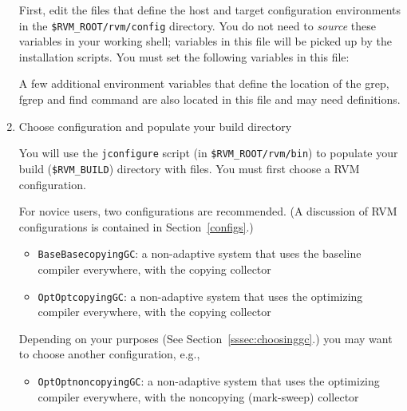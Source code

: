 \begin{enumerate}
First, edit the files that define the host and target configuration
environments in the {\tt \$RVM\_ROOT/rvm/config} directory.  You do not need to {\em
source} these variables in your working shell; variables in this file will be 
picked up by the installation scripts.  You must set the following
variables in this file:

A few additional environment variables that define the location of
the grep, fgrep and find command are also located in this file and
may need definitions.


\item Choose configuration and populate your build directory

You will use the {\tt jconfigure} script (in {\tt \$RVM\_ROOT/rvm/bin}) to
populate your build ({\tt \$RVM\_BUILD}) directory with files.  You must
first choose a RVM configuration.

For novice users, two configurations are recommended.  (A discussion
of RVM configurations is contained in Section~\ref{configs}.)

\begin{itemize}
\item {\tt BaseBasecopyingGC}: a non-adaptive system that uses the
baseline  compiler everywhere, with the copying collector
\item {\tt OptOptcopyingGC}: a non-adaptive system that uses the
optimizing compiler everywhere, with the copying collector
\end{itemize}

Depending on your purposes (See Section~\ref{sssec:choosinggc}.) you
may want to choose another configuration, e.g.,
\begin{itemize}
\item {\tt OptOptnoncopyingGC}: a non-adaptive system that uses the
optimizing  compiler everywhere, with the noncopying (mark-sweep) collector
\end{itemize}


\end{enumerate}
